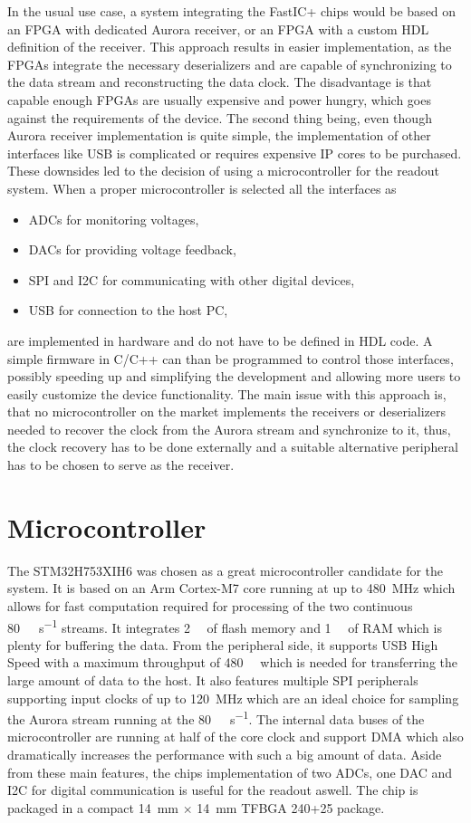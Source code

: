 In the usual use case, a system integrating the FastIC+ chips would be based on an FPGA with dedicated Aurora receiver, or an FPGA with a custom HDL definition of the receiver. This approach results in easier implementation, as the FPGAs integrate the necessary deserializers and are capable of synchronizing to the data stream and reconstructing the data clock. The disadvantage is that capable enough FPGAs are usually expensive and power hungry, which goes against the requirements of the device. The second thing being, even though Aurora receiver implementation is quite simple, the implementation of other interfaces like USB is complicated or requires expensive IP cores to be purchased. These downsides led to the decision of using a microcontroller for the readout system. 
When a proper microcontroller is selected all the interfaces as
\begin{itemize}
    \item ADCs for monitoring voltages,
    \item DACs for providing voltage feedback,
    \item SPI and I2C for communicating with other digital devices,
    \item USB for connection to the host PC,
\end{itemize}
are implemented in hardware and do not have to be defined in HDL code. A simple firmware in C/C++ can than be programmed to control those interfaces, possibly speeding up and simplifying the development and allowing more users to easily customize the device functionality. The main issue with this approach is, that no microcontroller on the market implements the receivers or deserializers needed to recover the clock from the Aurora stream and synchronize to it, thus, the clock recovery has to be done externally and a suitable alternative peripheral has to be chosen to serve as the receiver.

\section{Microcontroller}
The STM32H753XIH6 was chosen as a great microcontroller candidate for the system. It is based on an Arm Cortex-M7 core running at up to \SI{480}{\mega\hertz} which allows for fast computation required for processing of the two continuous \SI{80}{\mega\bit\per\second} streams. It integrates \SI{2}{\mega\byte} of flash memory and \SI{1}{\mega\byte} of RAM which is plenty for buffering the data. From the peripheral side, it supports USB High Speed with a maximum throughput of \SI{480}{\mega\bit} which is needed for transferring the large amount of data to the host. It also features multiple SPI peripherals supporting input clocks of up to \SI{120}{\mega\hertz} which are an ideal choice for sampling the Aurora stream running at the \SI{80}{\mega\bit\per\second}. The internal data buses of the microcontroller are running at half of the core clock and support DMA which also dramatically increases the performance with such a big amount of data. Aside from these main features, the chips implementation of two ADCs, one DAC and I2C for digital communication is useful for the readout aswell. The chip is packaged in a compact \SI{14}{\milli\meter} $\times$ \SI{14}{\milli\meter} TFBGA 240+25 package.

